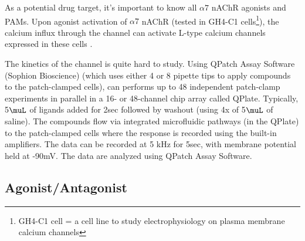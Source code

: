 As a potential drug target, it's important to know all $\alpha7$ nAChR agonists
and PAMs. Upon agonist activation of $\alpha7$ nAChR (tested in GH4-C1
cells\footnote{GH4-C1 cell = a cell line to study electrophysiology on plasma
membrane calcium channels}), the calcium influx through the channel can activate
L-type calcium channels expressed in these cells \citep{feuerbach2005}.


The kinetics of the channel is quite hard to study. Using QPatch Assay Software
(Sophion Bioscience) (which uses either 4 or 8 pipette tips to apply compounds
to the patch-clamped cells), \citep{friis2009} can performs up to 48 independent
patch-clamp experiments in parallel in a 16- or 48-channel chip array called
QPlate. Typically, 5$\muL$ of ligands added for 2sec followed by washout (using
4x of 5$\muL$ of saline). The compounds flow via integrated microfluidic
pathways (in the QPlate) to the patch-clamped cells where the response is
recorded using the built-in amplifiers. The data can be recorded at 5 kHz for
5sec, with membrane potential held at -90mV. The data are analyzed using QPatch
Assay Software.

\subsection{Agonist/Antagonist}

